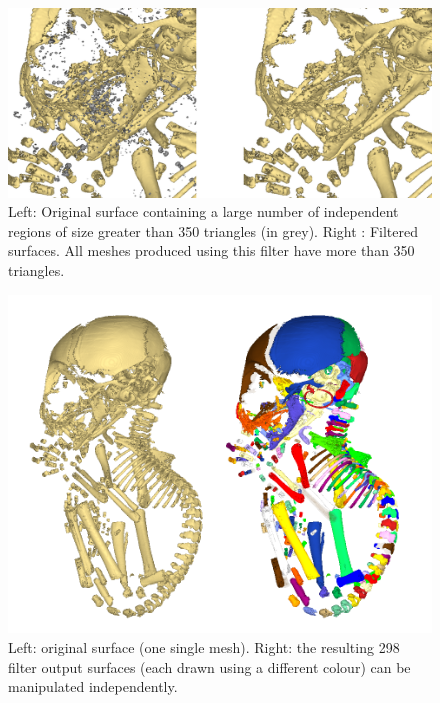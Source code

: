 \begin{figure}
  \centering
  \includegraphics[scale=0.3]{images/Edit_selected_objects/03_Decompose_34.png} 
	\caption{Left: Original surface containing a large number of independent regions of size greater than 350 triangles (in grey). Right : Filtered surfaces. All meshes produced using this filter have more than 350 triangles.}
\label{decompose34}
 
\end{figure}

\begin{figure}
  \centering
  \includegraphics[scale=0.4]{images/Edit_selected_objects/03_Decompose5.png} 
	\caption{Left: original surface (one single mesh). Right: the resulting 298 filter output surfaces (each drawn using a different colour) can be manipulated independently.}
\label{decompose5}
 
\end{figure}






